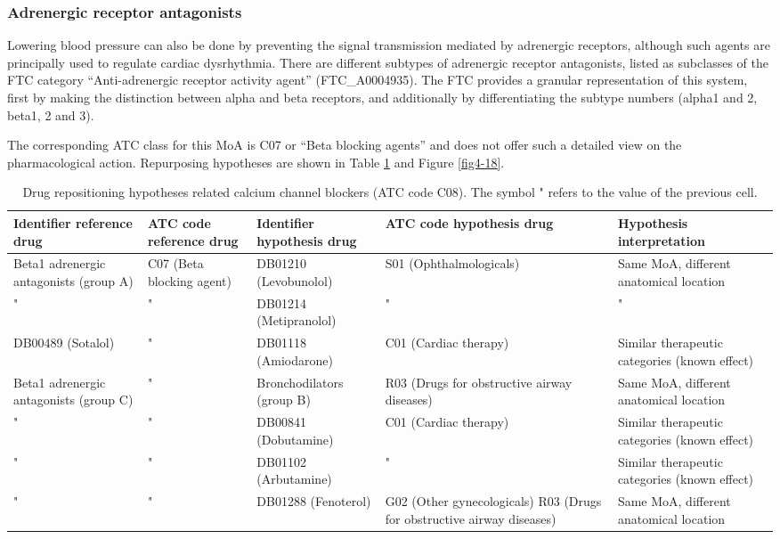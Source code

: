 \subsubsection{Adrenergic receptor antagonists}
Lowering blood pressure can also be done by preventing the signal transmission mediated by adrenergic receptors, although such agents are principally used to regulate cardiac dysrhythmia.
There are different subtypes of adrenergic receptor antagonists, listed as subclasses of the FTC category “Anti-adrenergic receptor activity agent” (FTC\_A0004935). The FTC provides a granular representation of this system, first by making the distinction between alpha and beta receptors, and additionally by differentiating the subtype numbers (alpha1 and 2, beta1, 2 and 3).

The corresponding ATC class for this MoA is C07 or “Beta blocking agents” and does not offer such a detailed view on the pharmacological action. Repurposing hypotheses are shown in Table \ref{tab:tablec07} and Figure \ref{fig4-18}.

\begin{table}[htbp]
\scriptsize
\begin{tabular}{|p{2cm}|p{2cm}|p{2cm}|p{3cm}|p{4cm}|}
\hline
\textbf{Identifier reference drug} & \textbf{ATC code reference drug} & \textbf{Identifier hypothesis drug} & \textbf{ATC code hypothesis drug} & \textbf{Hypothesis interpretation} \\ \hline
Beta1 adrenergic antagonists (group A) & C07 (Beta blocking agent) & DB01210 (Levobunolol) & S01 (Ophthalmologicals) & Same MoA, different anatomical location \\ \hline
" & " & DB01214 (Metipranolol) & " & " \\ \hline
DB00489 (Sotalol) & " & DB01118 (Amiodarone) & C01 (Cardiac therapy) & Similar therapeutic categories (known effect) \\ \hline
Beta1 adrenergic antagonists (group C) & " & Bronchodilators (group B) & R03 (Drugs for obstructive airway diseases) & Same MoA, different anatomical location \\ \hline
" & " & DB00841 (Dobutamine) & C01 (Cardiac therapy) & Similar therapeutic categories (known effect) \\ \hline
" & " & DB01102 (Arbutamine) & " & Similar therapeutic categories (known effect) \\ \hline
" & " & DB01288 (Fenoterol) & G02 (Other gynecologicals)
R03 (Drugs for obstructive airway diseases) & Same MoA, different anatomical location \\ \hline
\end{tabular}
\caption{Drug repositioning hypotheses related calcium channel blockers (ATC code C08). The symbol " refers to the value of the previous cell.}
\label{tab:tablec07}
\end{table}

